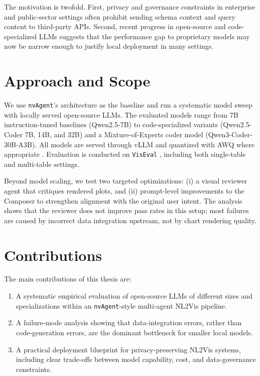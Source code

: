 \documentclass[a4paper,oneside,bibliography=totoc]{scrbook}
\begin{document}
The motivation is twofold. First, privacy and governance constraints in enterprise and public-sector settings often prohibit sending schema context and query content to third-party APIs. Second, recent progress in open-source and code-specialized LLMs suggests that the performance gap to proprietary models may now be narrow enough to justify local deployment in many settings.

\section{Approach and Scope}

We use \texttt{nvAgent}'s architecture as the baseline and run a systematic model sweep with locally served open-source LLMs. The evaluated models range from 7B instruction-tuned baselines (Qwen2.5-7B) to code-specialized variants (Qwen2.5-Coder 7B, 14B, and 32B) and a Mixture-of-Experts coder model (Qwen3-Coder-30B-A3B). All models are served through vLLM \cite{kwon2023vllm} and quantized with AWQ where appropriate \cite{lin2024awq}. Evaluation is conducted on \texttt{VisEval} \cite{chen2025viseval}, including both single-table and multi-table settings.

Beyond model scaling, we test two targeted optimizations: (i) a visual reviewer agent that critiques rendered plots, and (ii) prompt-level improvements to the Composer to strengthen alignment with the original user intent. The analysis shows that the reviewer does not improve pass rates in this setup; most failures are caused by incorrect data integration upstream, not by chart rendering quality.

\section{Contributions}

The main contributions of this thesis are:
\begin{enumerate}
  \item A systematic empirical evaluation of open-source LLMs of different sizes and specializations within an \texttt{nvAgent}-style multi-agent NL2Vis pipeline.
  \item A failure-mode analysis showing that data-integration errors, rather than code-generation errors, are the dominant bottleneck for smaller local models.
  \item A practical deployment blueprint for privacy-preserving NL2Vis systems, including clear trade-offs between model capability, cost, and data-governance constraints.
\end{enumerate}
\end{document}
